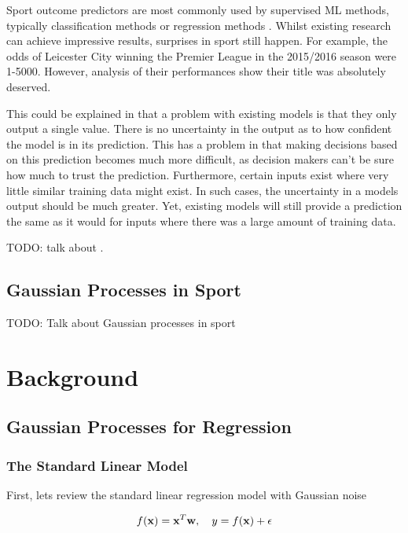 \documentclass[12pt,a4paper]{report}
\begin{document}
Sport outcome predictors are most commonly used by supervised ML methods, typically classification methods or regression methods \citep{horvat2020}. 
Whilst existing research can achieve impressive results, surprises in sport still happen. For example, the odds of Leicester City winning the Premier League in the 2015/2016 season were 1-5000. 
However, analysis of their performances show their title was absolutely deserved.

This could be explained in that a problem with existing models is that they only output a single value. 
There is no uncertainty in the output as to how confident the model is in its prediction. 
This has a problem in that making decisions based on this prediction becomes much more difficult, as decision makers can't be sure how much to trust the prediction. 
Furthermore, certain inputs exist where very little similar training data might exist. 
In such cases, the uncertainty in a models output should be much greater. 
Yet, existing models will still provide a prediction the same as it would for inputs where there was a large amount of training data.

 TODO: talk about \citep{Blumberg2020}.

\section{Gaussian Processes in Sport}

TODO: Talk about Gaussian processes in sport

\chapter{Background}

\section{Gaussian Processes for Regression}

\subsection{The Standard Linear Model}

First, lets review the standard linear regression model with Gaussian noise

\begin{equation}
    \centering
    {f(\textbf{x}) = \textbf{x}^T\textbf{w}, \quad y = f(\textbf{x}) + \epsilon}
\end{equation}
\end{document}
